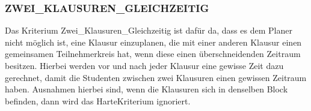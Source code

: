 \subsubsection{ZWEI\_KLAUSUREN\_GLEICHZEITIG}
Das Kriterium Zwei\_Klausuren\_Gleichzeitig ist dafür da, dass es dem Planer nicht möglich ist,
eine Klausur einzuplanen, die mit einer anderen Klausur einen gemeinsamen Teilnehmerkreis hat,
wenn diese einen überschneidenden Zeitraum besitzen.
Hierbei werden vor und nach jeder Klausur eine gewisse Zeit dazu gerechnet, damit die Studenten
zwischen zwei Klausuren einen gewissen Zeitraum haben.
Ausnahmen hierbei sind, wenn die Klausuren sich in denselben Block befinden, dann wird das HarteKriterium ignoriert.
